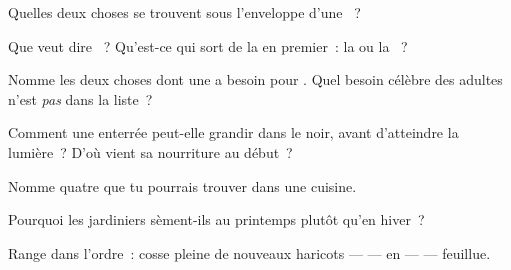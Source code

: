 \begin{exercise}[$\star$]\label{exo:g2:from-seed-to-plant:1}
Quelles deux choses se trouvent sous l'enveloppe d'une ~?
\end{exercise}

\begin{exercise}[$\star$]\label{exo:g2:from-seed-to-plant:2}
Que veut dire \emph{}~? Qu'est-ce qui sort de la  en
premier~: la  ou la ~?
\end{exercise}

\begin{exercise}[$\star$]\label{exo:g2:from-seed-to-plant:3}
Nomme les deux choses dont une  a besoin pour . Quel
besoin célèbre des  adultes n'est \emph{pas} dans la liste~?
\end{exercise}

\begin{exercise}[$\star$]\label{exo:g2:from-seed-to-plant:4}
Comment une  enterrée peut-elle grandir dans le noir,
avant d'atteindre la lumière~? D'où vient sa nourriture au début~?
\end{exercise}

\begin{exercise}[$\star$]\label{exo:g2:from-seed-to-plant:5}
Nomme quatre  que tu pourrais trouver dans une cuisine.
\end{exercise}

\begin{exercise}[$\star$]\label{exo:g2:from-seed-to-plant:6}
Pourquoi les jardiniers sèment-ils au printemps plutôt qu'en hiver~?
\end{exercise}

\begin{exercise}[$\star$]\label{exo:g2:from-seed-to-plant:7}
Range dans l'ordre~: cosse pleine de nouveaux haricots --- 
---  en  ---  ---  feuillue.
\end{exercise}

